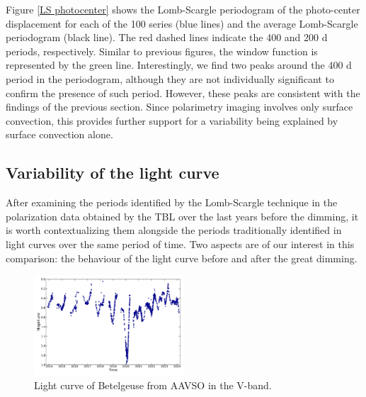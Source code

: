 \documentclass{aa}
\begin{document}
Figure \ref{LS photocenter} shows the Lomb-Scargle periodogram of the photo-center displacement for each of the 100 series (blue lines) and the average Lomb-Scargle periodogram (black line). 
The red dashed lines indicate the 400 and 
200 d periods, respectively. Similar to previous figures, the window function is represented by the green line. Interestingly, we find two peaks around the 400 d period in the periodogram, although they are not individually significant to confirm the presence of such period. However, these peaks are consistent with the findings of the previous section. Since polarimetry imaging involves only surface convection, this provides further support for a variability being explained by surface convection alone.


\subsection{Variability of the light curve}

After examining the periods identified by the Lomb-Scargle technique in the polarization data obtained by the TBL over the last years before the dimming, it is worth contextualizing them alongside the periods traditionally identified in light curves over the same period of time. Two aspects 
are of our interest in this comparison: the behaviour of the light curve before and after the great dimming.

\begin{figure}[!h]
    \centering
    \includegraphics[width=0.5\textwidth]{Light_curve_Betelgeuse.pdf}
    \caption{Light curve of Betelgeuse from AAVSO in the V-band.}
    \label{light curve Betelgeuse}
\end{figure}
\end{document}
